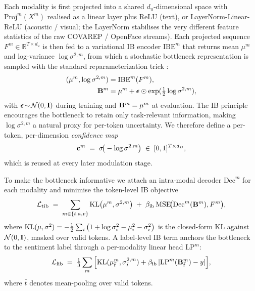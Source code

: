 Each modality is first projected into a shared $d_{u}$-dimensional space
with $\mathrm{Proj}^{m}(X^{m})$ realised as a linear layer plus ReLU
(text), or LayerNorm-Linear-ReLU (acoustic / visual; the LayerNorm
stabilises the very different feature statistics of the raw COVAREP /
OpenFace streams).
Each projected sequence $F^{m}\in\mathbb{R}^{T\times d_{u}}$ is then fed to
a variational IB encoder $\mathrm{IBE}^{m}$ that returns mean
$\mu^{m}$ and log-variance $\log\sigma^{2,m}$, from which a stochastic
bottleneck representation is sampled with the standard reparameterization
trick \citep{kingma2014vae,alemi2017vib}:
\begin{align}
  (\mu^{m},\log\sigma^{2,m}) &= \mathrm{IBE}^{m}(F^{m}), \\
  \mathbf{B}^{m} &= \mu^{m} + \boldsymbol{\epsilon}\odot\exp(\tfrac{1}{2}\log\sigma^{2,m}),
\end{align}
with $\boldsymbol{\epsilon}\!\sim\!\mathcal{N}(0,\mathbf{I})$ during training and
$\mathbf{B}^{m}=\mu^{m}$ at evaluation.
The IB principle \citep{tishby2000information,tishby2015dnn,alemi2017vib}
encourages the bottleneck to retain only task-relevant information,
making $\log\sigma^{2,m}$ a natural proxy for per-token uncertainty.
We therefore define a per-token, per-dimension \emph{confidence map}
\begin{equation}
  \mathbf{c}^{m} \;=\; \sigma\!\big(-\log\sigma^{2,m}\big)\;\in\;[0,1]^{T\times d_{B}},
  \label{eq:conf}
\end{equation}
which is reused at every later modulation stage.

To make the bottleneck informative we attach an intra-modal decoder
$\mathrm{Dec}^{m}$ for each modality and minimise the
token-level IB objective
\begin{equation}
  \mathcal{L}_{\text{tib}} \;=\; \sum_{m\in\{t,a,v\}} \mathrm{KL}\big(\mu^{m},\sigma^{2,m}\big) \;+\; \beta_{\mathrm{ib}}\,\mathrm{MSE}\!\big(\mathrm{Dec}^{m}(\mathbf{B}^{m}),F^{m}\big),
  \label{eq:tib}
\end{equation}
where $\mathrm{KL}(\mu,\sigma^{2}) = -\tfrac{1}{2}\sum_{i}\big(1+\log\sigma_{i}^{2}-\mu_{i}^{2}-\sigma_{i}^{2}\big)$
is the closed-form KL against $\mathcal{N}(0,\mathbf{I})$, masked over valid
tokens.
A label-level IB term anchors the bottleneck to the sentiment label
through a per-modality linear head $\mathrm{LP}^{m}$:
\begin{equation}
  \mathcal{L}_{\text{lib}} \;=\; \tfrac{1}{3}\sum_{m}\Big[\mathrm{KL}(\mu^{m}_{\bar{t}},\sigma^{2,m}_{\bar{t}}) + \beta_{\mathrm{ib}}\,|\mathrm{LP}^{m}(\mathbf{B}^{m}_{\bar{t}})-y|\Big],
  \label{eq:lib}
\end{equation}
where $\bar{t}$ denotes mean-pooling over valid tokens.

